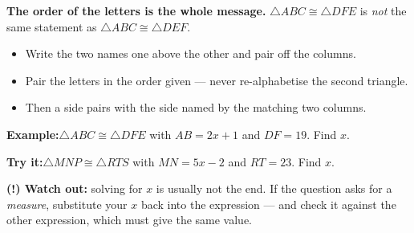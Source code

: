\documentclass[12pt]{article}
\begin{document}
\begin{formulabox}\textbf{The order of the letters is the whole message.}
$\triangle ABC \cong \triangle DFE$ is \emph{not} the same statement as
$\triangle ABC \cong \triangle DEF$.
\begin{itemize}[itemsep=1pt, topsep=2pt]
  \item Write the two names one above the other and pair off the columns.
  \item Pair the letters in the order given --- never re-alphabetise the second triangle.
  \item Then a side pairs with the side named by the matching two columns.
\end{itemize}
\end{formulabox}
\begin{examplebox}\textbf{Example:}\quad $\triangle ABC \cong \triangle DFE$ with $AB = 2x + 1$ and $DF = 19$. Find $x$.
\end{examplebox}
\begin{tryitbox}\textbf{Try it:}\quad $\triangle MNP \cong \triangle RTS$ with $MN = 5x - 2$ and $RT = 23$. Find $x$.\\[2pt]
\end{tryitbox}

\begin{watchoutbox}\textbf{(!) Watch out:} solving for $x$ is usually not the end. If the
question asks for a \emph{measure}, substitute your $x$ back into the expression --- and
check it against the other expression, which must give the same value.
\end{watchoutbox}
\end{document}
